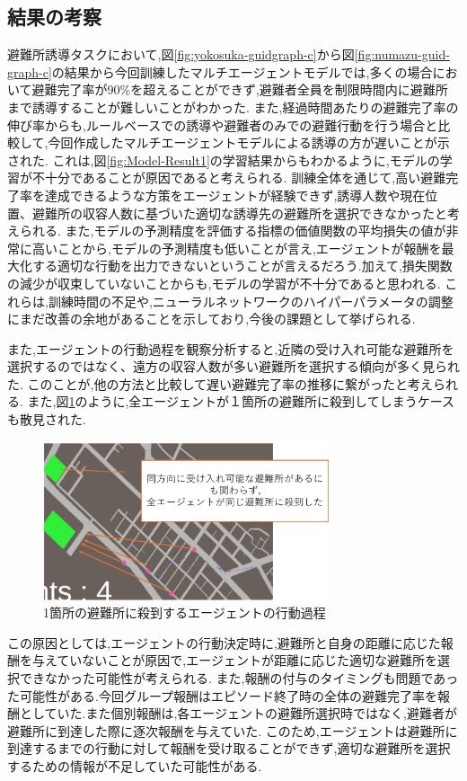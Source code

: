 \subsection{結果の考察}
避難所誘導タスクにおいて,図\ref{fig:yokosuka-guidgraph-c}から図\ref{fig:numazu-guid-graph-c}の結果から今回訓練したマルチエージェントモデルでは,多くの場合において避難完了率が90\%を超えることができず,避難者全員を制限時間内に避難所まで誘導することが難しいことがわかった.
また,経過時間あたりの避難完了率の伸び率からも,ルールベースでの誘導や避難者のみでの避難行動を行う場合と比較して,今回作成したマルチエージェントモデルによる誘導の方が遅いことが示された.
これは,図\ref{fig:Model-Result1}の学習結果からもわかるように,モデルの学習が不十分であることが原因であると考えられる.
訓練全体を通じて,高い避難完了率を達成できるような方策をエージェントが経験できず,誘導人数や現在位置、避難所の収容人数に基づいた適切な誘導先の避難所を選択できなかったと考えられる.
また,モデルの予測精度を評価する指標の価値関数の平均損失の値が非常に高いことから,モデルの予測精度も低いことが言え,エージェントが報酬を最大化する適切な行動を出力できないということが言えるだろう.加えて,損失関数の減少が収束していないことからも,モデルの学習が不十分であると思われる.
これらは,訓練時間の不足や,ニューラルネットワークのハイパーパラメータの調整にまだ改善の余地があることを示しており,今後の課題として挙げられる.

また,エージェントの行動過程を観察分析すると,近隣の受け入れ可能な避難所を選択するのではなく、遠方の収容人数が多い避難所を選択する傾向が多く見られた.
このことが,他の方法と比較して遅い避難完了率の推移に繋がったと考えられる.
また,図\ref{fig:GuidAgent-Tink1}のように,全エージェントが１箇所の避難所に殺到してしまうケースも散見された.
\begin{figure}[H] 
  \centering 
  \includegraphics[width=0.75\textwidth]{Figures/GuidAgent-Tink1.png}
  \caption{1箇所の避難所に殺到するエージェントの行動過程}
  \label{fig:GuidAgent-Tink1}
\end{figure}
この原因としては,エージェントの行動決定時に,避難所と自身の距離に応じた報酬を与えていないことが原因で,エージェントが距離に応じた適切な避難所を選択できなかった可能性が考えられる.
また,報酬の付与のタイミングも問題であった可能性がある.今回グループ報酬はエピソード終了時の全体の避難完了率を報酬としていた.また個別報酬は,各エージェントの避難所選択時ではなく,避難者が避難所に到達した際に逐次報酬を与えていた.
このため,エージェントは避難所に到達するまでの行動に対して報酬を受け取ることができず,適切な避難所を選択するための情報が不足していた可能性がある.

